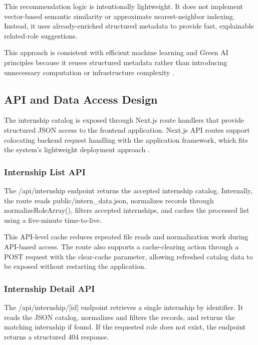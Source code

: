 This recommendation logic is intentionally lightweight. It does not implement vector-based semantic similarity or approximate nearest-neighbor indexing. Instead, it uses already-enriched structured metadata to provide fast, explainable related-role suggestions.

This approach is consistent with efficient machine learning and Green AI principles because it reuses structured metadata rather than introducing unnecessary computation or infrastructure complexity \cite{schwartz2020green, menghani2023efficient}.

\subsection{API and Data Access Design}

The internship catalog is exposed through Next.js route handlers that provide structured JSON access to the frontend application. Next.js API routes support colocating backend request handling with the application framework, which fits the system's lightweight deployment approach \cite{fielding2002principled, bass2012software, riva2022realworld}.

\subsubsection*{Internship List API}

The /api/internship endpoint returns the accepted internship catalog. Internally, the route reads public/intern\_data.json, normalizes records through normalizeRoleArray(), filters accepted internships, and caches the processed list using a five-minute time-to-live.

This API-level cache reduces repeated file reads and normalization work during API-based access. The route also supports a cache-clearing action through a POST request with the clear-cache parameter, allowing refreshed catalog data to be exposed without restarting the application.

\subsubsection*{Internship Detail API}

The /api/internship/[id] endpoint retrieves a single internship by identifier. It reads the JSON catalog, normalizes and filters the records, and returns the matching internship if found. If the requested role does not exist, the endpoint returns a structured 404 response.

